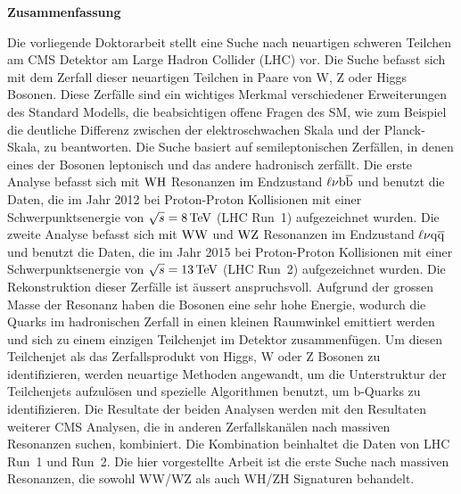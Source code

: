 \vspace*{\fill}

\begin{center}
\Large
\textbf{Zusammenfassung}
\end{center}

\small
\noindent Die vorliegende Doktorarbeit stellt eine Suche nach neuartigen schweren Teilchen am CMS Detektor am Large Hadron Collider (LHC) vor. Die Suche befasst sich mit dem Zerfall dieser neuartigen Teilchen in Paare von W, Z oder Higgs Bosonen. Diese Zerf\"alle sind ein wichtiges Merkmal verschiedener Erweiterungen des Standard Modells, die beabsichtigen offene Fragen des SM, wie zum Beispiel die deutliche Differenz zwischen der elektroschwachen Skala und der Planck-Skala, zu beantworten. Die Suche basiert auf semileptonischen Zerf\"allen, in denen eines der Bosonen leptonisch und das andere hadronisch zerf\"allt. Die erste Analyse befasst sich mit $\mathrm{W}\mathrm{H}$ Resonanzen im Endzustand $\ell\nu{\mathrm{b}\overline{\mathrm{b}}}$ und benutzt die Daten, die im Jahr 2012 bei Proton-Proton Kollisionen mit einer Schwerpunktsenergie von $\sqrt{s} = 8\,\text{Te\hspace{-.08em}V}$ (LHC Run~1) aufgezeichnet wurden. Die zweite Analyse befasst sich mit $\mathrm{W}\mathrm{W}$ und $\mathrm{W}\mathrm{Z}$ Resonanzen im Endzustand $\ell\nu\mathrm{q}\overline{\mathrm{q}}$ und benutzt die Daten, die im Jahr 2015 bei Proton-Proton Kollisionen mit einer Schwerpunktsenergie von $\sqrt{s} = 13\,\text{Te\hspace{-.08em}V}$ (LHC Run~2) aufgezeichnet wurden. Die Rekonstruktion dieser Zerf\"alle ist \"aussert anspruchsvoll. Aufgrund der grossen Masse der Resonanz haben die Bosonen eine sehr hohe Energie, wodurch die Quarks im hadronischen Zerfall in einen kleinen Raumwinkel emittiert werden und sich zu einem einzigen Teilchenjet im Detektor zusammenf\"ugen. Um diesen Teilchenjet als das Zerfallsprodukt von Higgs, W oder Z Bosonen zu identifizieren, werden neuartige Methoden angewandt, um die Unterstruktur der Teilchenjets aufzul\"osen und spezielle Algorithmen benutzt, um b-Quarks zu identifizieren. Die Resultate der beiden Analysen werden mit den Resultaten weiterer CMS Analysen, die in anderen Zerfallskan\"alen nach massiven Resonanzen suchen, kombiniert. Die Kombination beinhaltet die Daten von LHC Run~1 und Run~2.  Die hier vorgestellte Arbeit ist die erste Suche nach massiven Resonanzen, die sowohl WW/WZ als auch WH/ZH Signaturen behandelt.\\

